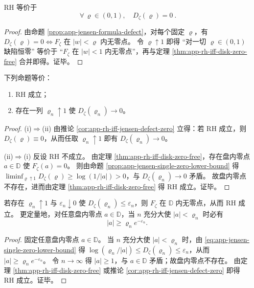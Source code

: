 \begin{corollary}\label{cor:app-rh-iff-jensen-defect-zero}
RH 等价于
\[
\boxed{\ \forall\,\varrho\in(0,1),\quad D_{\zeta}(\varrho)=0\ }.
\]
\end{corollary}
\begin{proof}
由命题 \ref{prop:app-jensen-formula-defect}，对每个固定 \(\varrho\)，有 \(D_{\zeta}(\varrho)=0\iff F_{\zeta}\) 在 \(|w|<\varrho\) 内无零点。
令 \(\varrho\uparrow 1\) 即得 “对一切 \(\varrho\in(0,1)\) 缺陷恒零” 等价于 “\(F_{\zeta}\) 在 \(|w|<1\) 内无零点”，再与定理 \ref{thm:app-rh-iff-disk-zero-free} 合并即得。证毕。
\end{proof}

\begin{theorem}[趋近边界的缺陷趋零判据]\label{thm:app-rh-iff-jensen-defect-vanishing-sequence}
下列命题等价：
\begin{enumerate}
  \item[(i)] RH 成立；
  \item[(ii)] 存在一列 \(\varrho_n\uparrow 1\) 使 \(D_{\zeta}(\varrho_n)\to 0\)。
\end{enumerate}
\end{theorem}
\begin{proof}
(i)\(\Rightarrow\)(ii) 由推论 \ref{cor:app-rh-iff-jensen-defect-zero} 立得：若 RH 成立，则 \(D_{\zeta}(\varrho)\equiv 0\)，从而任取 \(\varrho_n\uparrow 1\) 即有 \(D_{\zeta}(\varrho_n)\to 0\)。
\par
(ii)\(\Rightarrow\)(i) 反设 RH 不成立。
由定理 \ref{thm:app-rh-iff-disk-zero-free}，存在盘内零点 \(a\in\mathbb{D}\) 使 \(F_{\zeta}(a)=0\)。
则由命题 \ref{prop:app-jensen-single-zero-lower-bound} 得
\(
\liminf_{\varrho\uparrow 1}D_{\zeta}(\varrho)\ge \log(1/|a|)>0
\)，与 \(D_{\zeta}(\varrho_n)\to 0\) 矛盾。
故盘内零点不存在，进而由定理 \ref{thm:app-rh-iff-disk-zero-free} 得 RH 成立。证毕。
\end{proof}

\begin{corollary}[缺陷上界序列给出的零点排除证书]\label{cor:app-jensen-defect-upperbound-certificate}
若存在 \(\varrho_n\uparrow 1\) 与 \(\varepsilon_n\downarrow 0\) 使 \(D_{\zeta}(\varrho_n)\le \varepsilon_n\)，则 \(F_{\zeta}\) 在 \(\mathbb{D}\) 内无零点，从而 RH 成立。
更定量地，对任意盘内零点 \(a\in\mathbb{D}\)，当 \(n\) 充分大使 \(|a|<\varrho_n\) 时必有
\[
|a|\ge \varrho_n e^{-\varepsilon_n}.
\]
\end{corollary}
\begin{proof}
固定任意盘内零点 \(a\in\mathbb{D}\)。
当 \(n\) 充分大使 \(|a|<\varrho_n\) 时，由 \eqref{eq:app-jensen-single-zero-lower-bound} 得
\(
\log(\varrho_n/|a|)\le D_{\zeta}(\varrho_n)\le \varepsilon_n
\)，从而 \(|a|\ge \varrho_n e^{-\varepsilon_n}\)。
令 \(n\to\infty\) 得 \(|a|\ge 1\)，与 \(a\in\mathbb{D}\) 矛盾；故盘内零点不存在。
由定理 \ref{thm:app-rh-iff-disk-zero-free} 或推论 \ref{cor:app-rh-iff-jensen-defect-zero} 即得 RH 成立。证毕。
\end{proof}

